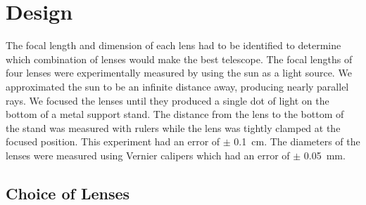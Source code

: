 \section{Design}
\label{sec:Design}

The focal length and dimension of each lens had to be identified to determine which combination of lenses would make the best telescope. The focal lengths of four lenses were experimentally measured by using the sun as a light source. We approximated the sun to be an infinite distance away, producing nearly parallel rays. We focused the lenses until they produced a single dot of light on the bottom of a metal support stand. The distance from the lens to the bottom of the stand was measured with rulers while the lens was tightly clamped at the focused position. This experiment had an error of $\pm$ \SI{0.1}{\centi\meter}. The diameters of the lenses were measured using Vernier calipers which had an error of $\pm$ \SI{0.05}{\milli\meter}. 

\subsection{Choice of Lenses}

